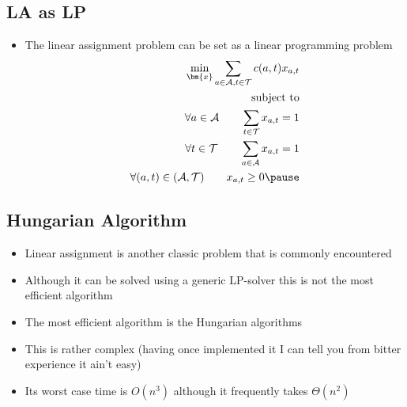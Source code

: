 
\begin{slide}
\section[-1]{LA as LP}

\begin{PauseHighLight}
  \begin{itemize}
  \item The linear assignment problem can be set as a linear programming
    problem
    \begin{align*}
      \min_{\bm{x}} \sum_{a\in\mathcal{A}, t\in\mathcal{T}} c(a,t)
      x_{a,t}\\
      \text{subject to}\\
      \forall a\in\mathcal{A} \quad \quad \sum_{t\in\mathcal{T}} x_{a,t}
      = 1 \\
      \forall  t\in\mathcal{T} \quad \quad \sum_{a\in\mathcal{A}} x_{a,t}
      = 1 \\
      \forall (a,t)\in(\mathcal{A},\mathcal{T}) \quad \quad x_{a,t}\geq 0\pause
    \end{align*}
  \end{itemize}
\end{PauseHighLight}

\end{slide}


\begin{slide}
\section{Hungarian Algorithm}

\begin{PauseHighLight}
  \begin{itemize}
  \item Linear assignment is another classic problem that is commonly
    encountered\pause
  \item Although it can be solved using a generic LP-solver this is not
    the most efficient algorithm\pause
  \item The most efficient algorithm is the Hungarian algorithms\pause
  \item This is rather complex (having once implemented it I can tell
    you from bitter experience it ain't easy)\pause
  \item Its worst case time is $O(n^3)$ although it frequently takes
    $\Theta(n^2)$\pause
  \end{itemize}
\end{PauseHighLight}

\end{slide}

